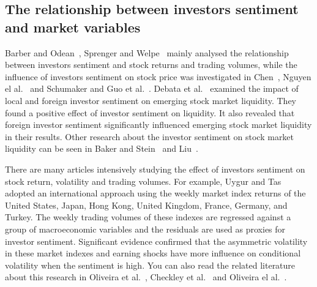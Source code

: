 \documentclass[review,3p,times,12pt,number]{elsarticle}
\begin{document}
\subsection{The relationship between investors sentiment and market variables}
Barber and Odean~\cite{Barber2008}, Sprenger and Welpe~\cite{Sprenger2014Tweets} mainly analysed the relationship between investors sentiment and stock returns and trading volumes, while the influence of investors sentiment on stock price was investigated in Chen~\cite{schumaker2009textual}, Nguyen el al.~\cite{Nguyen2015Sentiment} and Schumaker and Guo et al.~\cite{Guo2017Can}.
Debata et al.~\cite{Debata2017Investor} examined the impact of local and foreign investor sentiment on emerging stock market liquidity. They found a positive effect of investor sentiment on liquidity. It also revealed that foreign investor sentiment significantly influenced emerging stock market liquidity in their results. Other research about the investor sentiment on stock market liquidity can be seen in Baker and Stein~\cite{baker2004market} and Liu~\cite{Liu2015Investor}.

There are many articles intensively studying the effect of investors sentiment on stock return, volatility and trading volumes.
For example, Uygur and Tas~\cite{Uygur2014} adopted an international approach using the weekly market index returns of the United States, Japan, Hong Kong, United Kingdom, France, Germany, and Turkey. The weekly trading volumes of these indexes are regressed against a group of macroeconomic variables and the residuals are used as proxies for investor sentiment. Significant evidence confirmed that the asymmetric volatility in these market indexes and earning shocks have more influence on conditional volatility when the sentiment is high.
You can also read the related literature about this research in Oliveira et al.~\cite{Oliveira2013On}, Checkley et al.~\cite{Checkley2017The} and Oliveira el al.~\cite{Oliveira2017The}.
\end{document}
